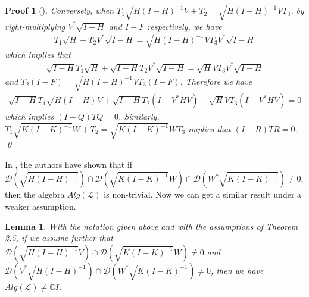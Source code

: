 \documentclass{jaums}
\theoremstyle{thmit} %
\newtheorem{lemma}[theorem]{Lemma}
\theoremstyle{thmrm} %
\newtheorem*{oldproof}{Proof}
\renewenvironment{proof}[1][{}]{\begin{oldproof}[#1]}{\qed\end{oldproof}}
\begin{document}
\begin{proof}
Conversely, when $T_1\sqrt{H(I-H)^{-1}}V+T_2=\sqrt{H(I-H)^{-1}}VT_3$, by
right-multiplying $V^*\sqrt{I-H}$ and $I-F$ respectively, we have
$$T_1\sqrt{H}+T_2V^*\sqrt{I-H}=\sqrt{H(I-H)^{-1}}VT_3V^*\sqrt{I-H}$$
which implies that
\begin{align}
\sqrt{I-H}T_1\sqrt{H}+\sqrt{I-H}T_2V^*\sqrt{I-H}=\sqrt{H}VT_3V^*\sqrt{I-H}
\end{align}
and $T_2(I-F)=\sqrt{H(I-H)^{-1}}VT_3(I-F)$. Therefore we have
\begin{eqnarray*}
\sqrt{I-H}T_1\sqrt{H(I-H)}V+\sqrt{I-H}T_2(I-V^*HV)- \sqrt{H}VT_3(I-V^*HV)=0
\end{eqnarray*}
which implies $(I-Q)TQ=0$. Similarly, $T_1\sqrt{K(I-K)^{-1}}W+T_2 =
\sqrt{K(I-K)^{-1}}WT_3$ implies that $(I-R)TR=0$.
\end{proof}


In {\cite{[GY2]}}, the authors have shown that if
$$\mathcal{D}(\sqrt{H(I-H)^{-1}})\cap
\mathcal{D}(\sqrt{K(I-K)^{-1}}W)\cap\mathcal{D}(W^{*}\sqrt{K(I-K)^{-1}})\neq
0,$$
 then the algebra $Alg(\mathcal{L})$ is non-trivial. Now we can get a similar
result under a weaker assumption.


\begin{lemma} With the notation given above and with the assumptions of Theorem
2.5, if we
assume further that $\mathcal{D}(\sqrt{H(I-H)^{-1}}V)\cap
\mathcal{D}(\sqrt{K(I-K)^{-1}}W)\neq0$ and
$\mathcal{D}(V^*\sqrt{H(I-H)^{-1}})\cap
\mathcal{D}(W^{*}\sqrt{K(I-K)^{-1}})\neq0$,
then we have $Alg(\mathcal{L})\neq\mathbb{C}I$.
\end{lemma}
\end{document}

